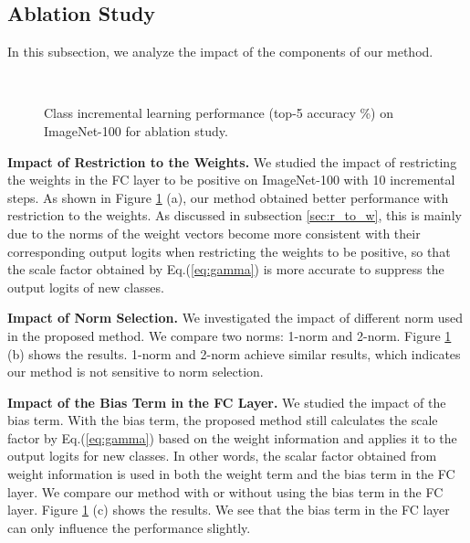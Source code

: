 \documentclass[10pt,twocolumn,letterpaper]{article}
\begin{document}
\subsection{Ablation Study}
In this subsection, we analyze the impact of the components of our method. 

\begin{figure}[t]
\centering
{}
\\ \vspace{-2mm}
\caption{Class incremental learning performance (top-5 accuracy \%) on ImageNet-100 for ablation study.}
\label{fig:ablation}
\end{figure}

\noindent\textbf{Impact of Restriction to the Weights.} We studied the impact of restricting the weights in the FC layer to be positive on ImageNet-100 with 10 incremental steps. As shown in Figure \ref{fig:ablation} (a), our method obtained better performance with restriction to the weights. As discussed in subsection \ref{sec:r_to_w}, this is mainly due to the norms of the weight vectors become more consistent with their corresponding output logits when restricting the weights to be positive, so that the scale factor  obtained by Eq.(\ref{eq:gamma}) is more accurate to suppress the output logits of new classes.

\noindent\textbf{Impact of Norm Selection.} We investigated the impact of different norm used in the proposed method. We compare two norms: 1-norm and 2-norm. Figure \ref{fig:ablation} (b) shows the results. 1-norm and 2-norm achieve similar results, which indicates our method is not sensitive to norm selection.

\noindent\textbf{Impact of the Bias Term in the FC Layer.} We studied the impact of the bias term. With the bias term, the proposed method still calculates the scale factor  by Eq.(\ref{eq:gamma}) based on the weight information and applies it to the output logits for new classes. In other words, the scalar factor  obtained from weight information is used in both the weight term and the bias term in the FC layer. We compare our method with or without using the bias term in the FC layer. Figure \ref{fig:ablation} (c) shows the results. We see that the bias term in the FC layer can only influence the performance slightly.
\end{document}
